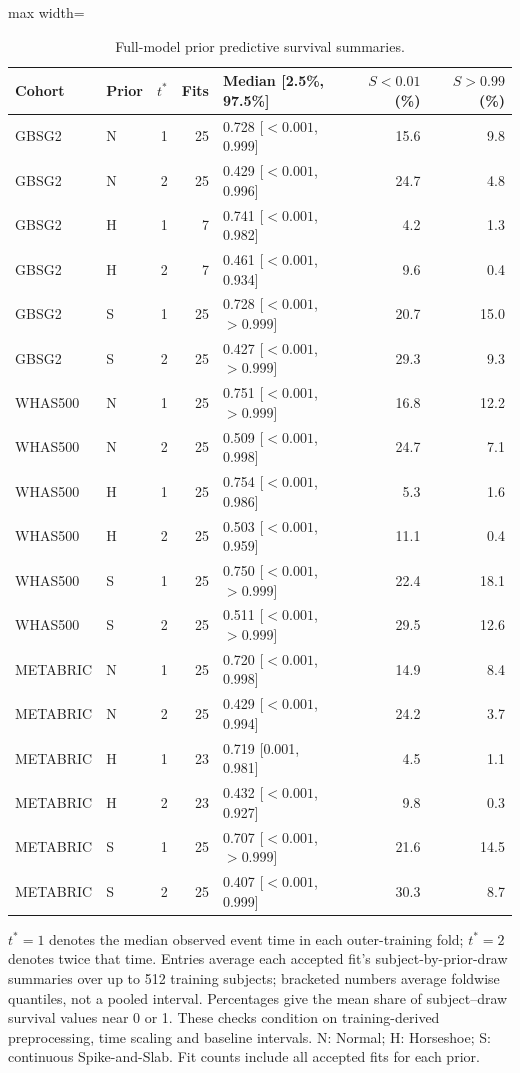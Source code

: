 \begin{table}[htbp]
\centering
\begingroup\singlespacing\footnotesize
\setlength{\tabcolsep}{3pt}
\caption{Full-model prior predictive survival summaries.}\label{tab:exam-prior-predictive}
\begin{adjustbox}{max width=\textwidth}
\begin{tabular}{@{}llrrlrr@{}}
\toprule Cohort & Prior & $t^*$ & Fits & Median [2.5\%, 97.5\%] & $S<0.01$ (\%) & $S>0.99$ (\%)\\\midrule
GBSG2 & N & 1 & 25 & 0.728 [$<0.001$, 0.999] & 15.6 & 9.8\\
GBSG2 & N & 2 & 25 & 0.429 [$<0.001$, 0.996] & 24.7 & 4.8\\
GBSG2 & H & 1 & 7 & 0.741 [$<0.001$, 0.982] & 4.2 & 1.3\\
GBSG2 & H & 2 & 7 & 0.461 [$<0.001$, 0.934] & 9.6 & 0.4\\
GBSG2 & S & 1 & 25 & 0.728 [$<0.001$, $>0.999$] & 20.7 & 15.0\\
GBSG2 & S & 2 & 25 & 0.427 [$<0.001$, $>0.999$] & 29.3 & 9.3\\
WHAS500 & N & 1 & 25 & 0.751 [$<0.001$, $>0.999$] & 16.8 & 12.2\\
WHAS500 & N & 2 & 25 & 0.509 [$<0.001$, 0.998] & 24.7 & 7.1\\
WHAS500 & H & 1 & 25 & 0.754 [$<0.001$, 0.986] & 5.3 & 1.6\\
WHAS500 & H & 2 & 25 & 0.503 [$<0.001$, 0.959] & 11.1 & 0.4\\
WHAS500 & S & 1 & 25 & 0.750 [$<0.001$, $>0.999$] & 22.4 & 18.1\\
WHAS500 & S & 2 & 25 & 0.511 [$<0.001$, $>0.999$] & 29.5 & 12.6\\
METABRIC & N & 1 & 25 & 0.720 [$<0.001$, 0.998] & 14.9 & 8.4\\
METABRIC & N & 2 & 25 & 0.429 [$<0.001$, 0.994] & 24.2 & 3.7\\
METABRIC & H & 1 & 23 & 0.719 [0.001, 0.981] & 4.5 & 1.1\\
METABRIC & H & 2 & 23 & 0.432 [$<0.001$, 0.927] & 9.8 & 0.3\\
METABRIC & S & 1 & 25 & 0.707 [$<0.001$, $>0.999$] & 21.6 & 14.5\\
METABRIC & S & 2 & 25 & 0.407 [$<0.001$, 0.999] & 30.3 & 8.7\\
\bottomrule
\end{tabular}
\end{adjustbox}
\par\smallskip
\begin{minipage}{\textwidth}
$t^*=1$ denotes the median observed event time in each outer-training fold; $t^*=2$ denotes twice that time. Entries average each accepted fit's subject-by-prior-draw summaries over up to 512 training subjects; bracketed numbers average foldwise quantiles, not a pooled interval. Percentages give the mean share of subject--draw survival values near 0 or 1. These checks condition on training-derived preprocessing, time scaling and baseline intervals. N: Normal; H: Horseshoe; S: continuous Spike-and-Slab. Fit counts include all accepted fits for each prior.
\end{minipage}
\endgroup
\end{table}
